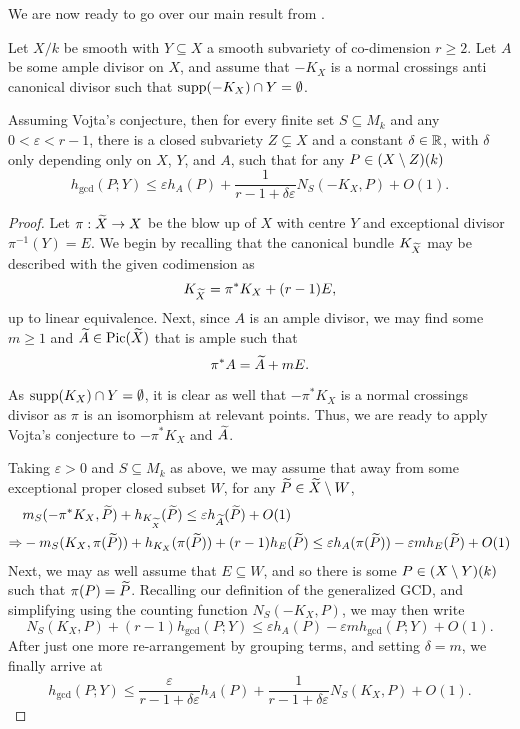 We are now ready to go over our main result from \cite{Silverman_2004}.

\begin{theorem}
    Let $X/k$ be smooth with $Y \subseteq X$ a smooth subvariety of co-dimension $r \geq 2$.
    Let $A$ be some ample divisor on $X$,
    and assume that $-K_X$ is a normal crossings anti canonical divisor such that ${\rm supp}(-K_X) \cap Y = \emptyset$.

    Assuming Vojta's conjecture,
    then for every finite set $S \subseteq M_k$ and any $0 < \varepsilon < r - 1$,
    there is a closed subvariety $Z \subsetneq X$ and a constant $\delta \in \mathbb{R}$,
    with $\delta$ only depending only on $X$, $Y$, and $A$,
    such that for any $P \in (X \setminus Z)(k)$
    \[
        h_{\gcd}(P; Y)
            \leq \varepsilon h_{A}(P) + \frac{1}{r - 1 + \delta \varepsilon} N_S(-K_X, P) + O(1).
    \]
\end{theorem}

\begin{proof}
    Let $\pi : \widetilde X \to X$ be the blow up of $X$ with centre $Y$ and exceptional divisor $\pi^{-1}(Y) = E$.
    We begin by recalling that the canonical bundle $K_{\widetilde X}$ may be described with the given codimension as
    \[
        K_{\widetilde X} = \pi^* K_X + (r - 1)E,
    \]
    up to linear equivalence.
    Next, since $A$ is an ample divisor,
    we may find some $m \geq 1$ and $\widetilde A \in {\rm Pic}(\widetilde X)$ that is ample such that
    \[
        \pi^*A = \widetilde A + m E.
    \]

    As ${\rm supp}(K_X) \cap Y = \emptyset$,
    it is clear as well that $-\pi^* K_X$ is a normal crossings divisor as $\pi$ is an isomorphism at relevant points.
    Thus, we are ready to apply Vojta's conjecture to $-\pi^*K_X$ and $\widetilde A$.

    Taking $\varepsilon > 0$ and $S \subseteq M_k$ as above,
    we may assume that away from some exceptional proper closed subset $W$,
    for any $\widetilde P \in \widetilde X \setminus W$,
    \begin{align*}
        & m_S(-\pi^*K_X, \widetilde P)
        + h_{K_{\widetilde X}}(\widetilde P)
        \leq \varepsilon h_{\widetilde A}(\widetilde P)
        + O(1) \\
        \Rightarrow
        & -m_S(K_X, \pi(\widetilde P))
        + h_{K_X}(\pi(\widetilde P))
        + (r - 1)h_{E}(\widetilde P)
        \leq \varepsilon h_{A}(\pi(\widetilde P))
            - \varepsilon m h_{E}(\widetilde P)
            + O(1)
    \end{align*}
    Next, we may as well assume that $E \subseteq W$,
    and so there is some $P \in (X \setminus Y)(k)$ such that $\pi(P) = \widetilde P$.
    Recalling our definition of the generalized GCD,
    and simplifying using the counting function $N_S(-K_X, P)$,
    we may then write
    \[
        N_S(K_X, P)
        + (r - 1)h_{\gcd}(P; Y)
        \leq \varepsilon h_A(P)
        - \varepsilon m
        h_{\gcd}(P; Y) + O(1).
    \]
    After just one more re-arrangement by grouping terms,
    and setting $\delta = m$,
    we finally arrive at
    \[
        h_{\gcd}(P; Y)
        \leq \frac{\varepsilon}{r - 1 + \delta \varepsilon} h_A(P)
        + \frac{1}{r - 1 + \delta \varepsilon} N_S(K_X, P)+ O(1).
    \]
\end{proof}

